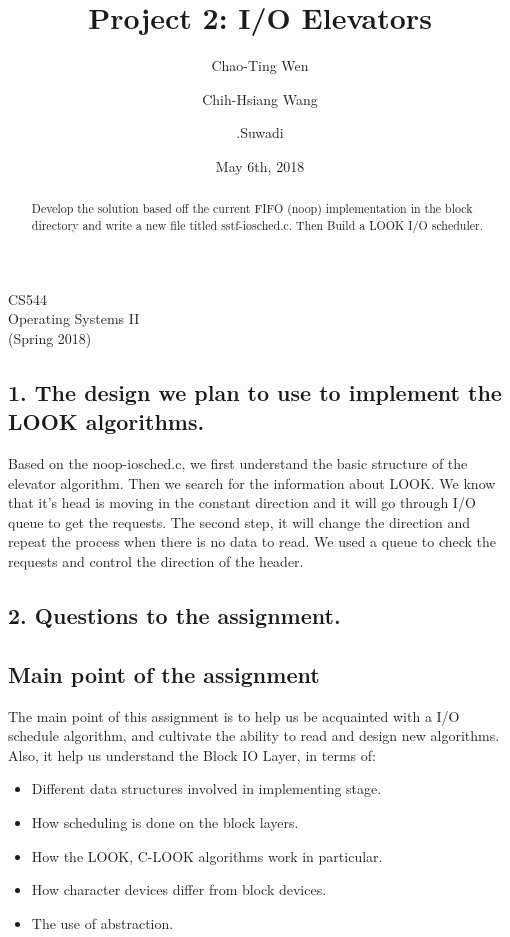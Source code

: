 \documentclass[english,10pt,letterpaper,onecolumn]{IEEEtran}
\title{Project 2: I/O Elevators}
\author{
  Chao-Ting Wen \hspace{.5cm}
  \and
  Chih-Hsiang Wang \hspace{.5cm}
  \and
  .Suwadi
}
\date{May 6th, 2018}
\begin{document}
\begin{titlepage} 
\maketitle
\begin{center}
CS544\\
Operating Systems II\\
(Spring 2018)
\vspace{50 mm}
\end{center}

\begin{abstract}
Develop the solution based off the current FIFO (noop) implementation in the block directory and write a new file titled sstf-iosched.c. Then Build a LOOK I/O scheduler.

\end{abstract}
\end{titlepage}

\clearpage
\subsection*{\bf 1. The design we plan to use to implement the LOOK algorithms.}
Based on the noop-iosched.c, we first understand the basic structure of the elevator algorithm. Then we search for the information about LOOK. We know that it's head is moving in the constant direction and it will go through I/O queue to get the requests. The second step, it will change the direction and repeat the process when there is no data to read. We used a queue to check the requests and control the direction of the header.

\subsection*{\bf 2. Questions to the assignment.}
\subsection{Main point of the assignment}
The main point of this assignment is to help us be acquainted with a I/O schedule algorithm, and cultivate the ability to read and design new algorithms. Also, it help us understand the Block IO Layer, in terms of:
\begin{itemize}
	\item Different data structures involved in implementing stage.
    \item How scheduling is done on the block layers.
	\item How the LOOK, C-LOOK algorithms work in particular.
	\item How character devices differ from block devices.
    \item The use of abstraction.
\end{itemize}
\end{document}
